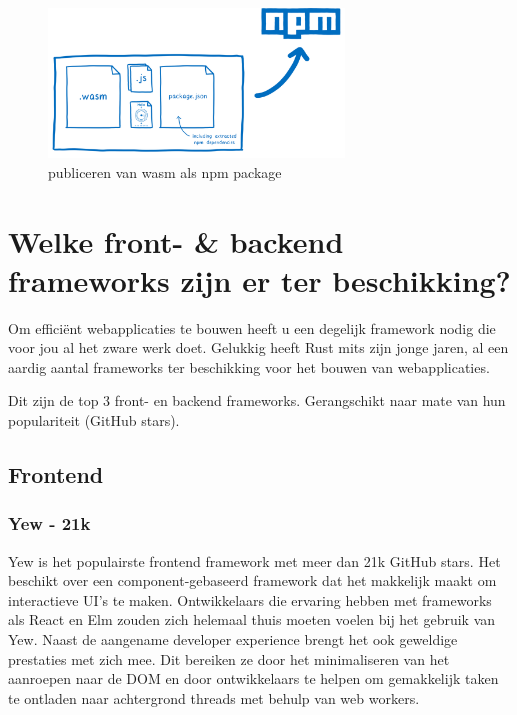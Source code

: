 \begin{figure}[h]
  \centering
  \includegraphics[width=0.7\textwidth]{figures/wasm_to_npm.png}
  \caption{publiceren van wasm als npm package}
\end{figure}




\clearpage

\section{Welke front- \& backend frameworks zijn er ter beschikking?}
\label{frameworks}

Om efficiënt webapplicaties te bouwen heeft u een degelijk framework nodig die voor jou al het zware
werk doet. Gelukkig heeft Rust mits zijn jonge jaren, al een aardig aantal frameworks ter
beschikking voor het bouwen van webapplicaties.  

Dit zijn de top 3 front- en backend frameworks. Gerangschikt naar mate van hun populariteit (GitHub
stars).

\subsection{Frontend}

\subsubsection{Yew - 21k} 

Yew is het populairste frontend framework met meer dan 21k GitHub stars. Het beschikt
over een component-gebaseerd framework dat het makkelijk maakt om interactieve UI’s te maken.
Ontwikkelaars die ervaring hebben met frameworks als React en Elm zouden zich helemaal thuis moeten
voelen bij het gebruik van Yew. Naast de aangename developer experience brengt het ook geweldige
prestaties met zich mee. Dit bereiken ze door het minimaliseren van het aanroepen naar de DOM en
door ontwikkelaars te helpen om gemakkelijk taken te ontladen naar achtergrond threads met behulp
van web workers. 

